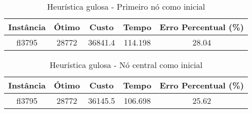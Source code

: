 \documentclass[10pt]{extarticle} %
\begin{document}
\begin{table}[h]
    \centering
    \begin{tabular}{|c|c|c|c|c|} \hline 
         \textbf{Instância} & \textbf{Ótimo} & \textbf{Custo} & \textbf{Tempo} & \textbf{Erro Percentual (\%)} \\ \hline 
         fl3795       & 28772     & 36841.4    & 114.198  & 28.04 \\ \hline
    \end{tabular}
    \caption{Heurística gulosa - Primeiro nó como inicial}
    \label{tab:my_label}
\end{table}

\begin{table}[h]
    \centering
    \begin{tabular}{|c|c|c|c|c|} \hline 
         \textbf{Instância} & \textbf{Ótimo} & \textbf{Custo} & \textbf{Tempo} & \textbf{Erro Percentual (\%)} \\ \hline 
         fl3795       & 28772     & 36145.5    & 106.698  & 25.62 \\ \hline
    \end{tabular}
    \caption{Heurística gulosa - Nó central como inicial}
    \label{tab:my_label}
\end{table}
\end{document}
